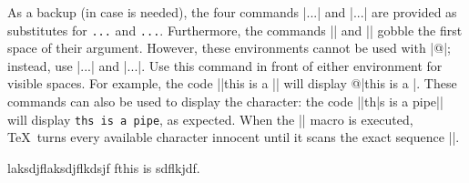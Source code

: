 As a backup (in case {\tt\pipe} is needed), the four commands |\bverb...\everb| and |\bverbatim...\everbatim| are provided as substitutes for {\tt\pipe...\pipe} and {\tt\pipe\pipe...\pipe\pipe}. Furthermore, the commands |\bverb| and |\bverbs| gobble the first space of their argument. However, these environments cannot be used with |@|; instead, use |\bverbs...\everbs| and |\bverbatims...\everbatims|. Use this command in front of either environment for visible spaces. For example, the code
||\svs\bverb this is a \test\everb||
will display @|this is a \test|.
These commands can also be used to display the {\tt\pipe} character: the code
||\bverb th|s is a pipe\everb||
will display {\tt th\pipe s is a pipe}, as expected. When the |\bverb| macro is executed, \TeX\ turns every available character innocent until it scans the exact sequence |\everb|.

\bverb laksdjflaksdjflkdsjf fthis is \undefined \bye sdflkjdf\ev@erb. \everb

\bye